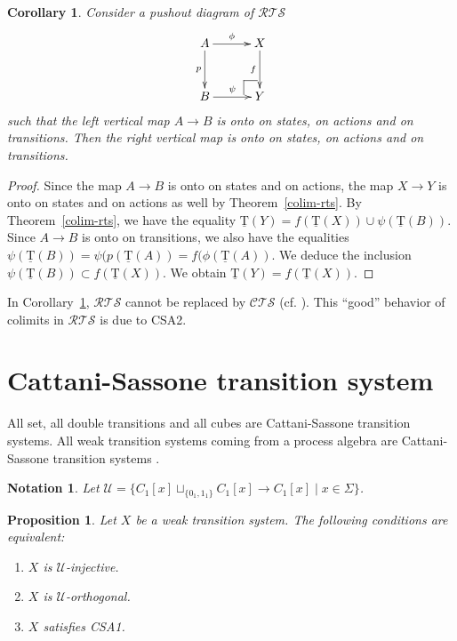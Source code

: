 \documentclass[a4paper,12pt]{amsart}
\newtheorem{prop}[thm]{Proposition}
\newtheorem{cor}[thm]{Corollary}
\newtheorem{nota}[thm]{Notation}
\begin{document}
\begin{cor} \label{onto-trans-rts} Consider a pushout diagram of ${\mathcal{R\!T\!S}}$
\[
\xymatrix@C=3em@R=3em
{
A {\ar@{->}[r]^-{{\phi}}} {\ar@{->}[d]_-{{p}}} & X {\ar@{->}[d]_-{{f}}} \\
B {\ar@{->}[r]^-{{\psi}}} & {  \ar@{-}[]+L+<-6pt,+2pt>;[]+LU+<-6pt,+6pt>  \ar@{-}[]+U+<-2pt,+6pt>;[]+LU+<-6pt,+6pt>} Y
}
\]
such that the left vertical map $A\to B$ is onto on states, on actions
and on transitions. Then the right vertical map is onto on states, on
actions and on transitions. 
\end{cor}

\begin{proof} Since the map $A\to B$ is onto on states and on actions, the map
$X\to Y$ is onto on states and on actions as well by
Theorem~\ref{colim-rts}.  By Theorem~\ref{colim-rts}, we have the
equality $\operatorname{\underline{T}}(Y)= f(\operatorname{\underline{T}}(X)) \cup \psi(\operatorname{\underline{T}}(B))$. Since $A\to B$ is onto
on transitions, we also have the equalities $\psi(\operatorname{\underline{T}}(B)) =
\psi(p(\operatorname{\underline{T}}(A)) = f(\phi(\operatorname{\underline{T}}(A))$. We deduce the inclusion
$\psi(\operatorname{\underline{T}}(B)) \subset f(\operatorname{\underline{T}}(X))$. We obtain $\operatorname{\underline{T}}(Y)= f(\operatorname{\underline{T}}(X))$.  \end{proof}

In Corollary~\ref{onto-trans-rts}, ${\mathcal{R\!T\!S}}$ cannot be replaced by ${\mathcal{C\!T\!S}}$
(cf. \cite[Proposition~A.1]{csts}). This ``good'' behavior of colimits
in ${\mathcal{R\!T\!S}}$ is due to CSA2.

\section{Cattani-Sassone transition system}
\label{def-csts}

All set, all double transitions and all cubes are Cattani-Sassone
transition systems. All weak transition systems coming from a process
algebra are Cattani-Sassone transition systems \cite{ccsprecub}
\cite{symcub}.

\begin{nota}
  Let 
$\mathcal{U} =
  \{C_1[x]\sqcup_{\{0_1,1_1\}} C_1[x] \to C_1[x] \mid x \in \Sigma\}$.
\end{nota}

\begin{prop} \label{CSA1-carac} Let $X$ be a weak transition system. The
following conditions are equivalent:
\begin{enumerate}
\item $X$ is $\mathcal{U}$-injective.
\item $X$ is $\mathcal{U}$-orthogonal.
\item $X$ satisfies CSA1.
\end{enumerate}
\end{prop} 
\end{document}
